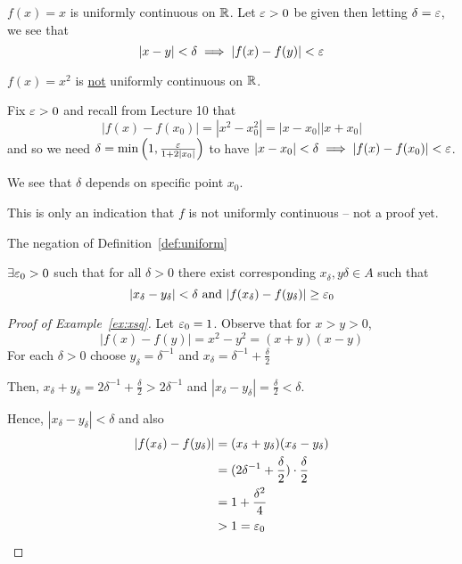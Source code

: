 \begin{example*}
    $f(x) = x$ is uniformly continuous on $\mathbb R$. 
    Let $\varepsilon > 0$ be given then letting $\delta = \varepsilon$, we see that 
    $$|x-y| < \delta \implies |f(x) - f(y)| < \varepsilon$$
\end{example*}

\begin{example*}\label{ex:xsq}
    $f(x) = x^2$ is \underline{not} uniformly continuous on $\mathbb R$.
\end{example*}

Fix $\varepsilon > 0$ and recall from Lecture 10 that
$$|f(x) - f(x_0)| = |x^2 - x_0^2| = |x - x_0||x + x_0|$$
and so we need $\delta = \min\left(1, \frac{\varepsilon}{1 + 2|x_0|}\right)$
to have $|x-x_0| < \delta \implies |f(x) - f(x_0)| < \varepsilon$.

We see that $\delta$ depends on specific point $x_0$.

This is only an indication that $f$ is not uniformly continuous -- not a proof yet.


The negation of Definition~\ref{def:uniform}

\begin{definition*}[$61'$]
    $\exists \varepsilon_0 > 0$ such that for all $\delta > 0$ there exist corresponding $x_\delta, y\delta \in A$ such that
    $$|x_\delta - y_\delta| < \delta\text{ and } |f(x_\delta) - f(y_\delta)| \geq \varepsilon_0$$
\end{definition*}

\begin{proof}[Proof of Example~\ref{ex:xsq}]
    Let $\varepsilon_0 = 1$. Observe that for $x > y > 0$,
    $$|f(x) - f(y)| = x^2 - y^2 = (x+y)(x-y)$$
    For each $\delta > 0$ choose $y_\delta = \delta^{-1}$ and $x_\delta = \delta^{-1} + \frac{\delta}{2}$

    Then, $x_\delta + y_\delta = 2\delta^{-1} + \frac{\delta}{2} > 2\delta^{-1}$ and
    $|x_\delta - y_\delta| =\frac{\delta}{2} < \delta$. 

    Hence, $|x_\delta - y_\delta| < \delta$ and also 
    \begin{align*}
        |f(x_\delta) - f(y_\delta)|&= (x_\delta + y_\delta)(x_\delta - y_\delta) \\
        &= (2\delta^{-1} + \frac{\delta}{2})\cdot\frac{\delta}{2} \\
        &= 1 + \frac{\delta^2}{4} \\
        &> 1 = \varepsilon_0
    \end{align*}
\end{proof}

